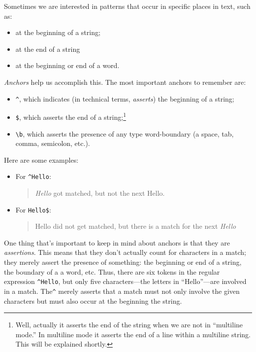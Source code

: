 \documentclass[]{book}
\providecommand{\tightlist}{%
  \setlength{\itemsep}{0pt}\setlength{\parskip}{0pt}}
\let\rmarkdownfootnote\footnote%
\def\footnote{\protect\rmarkdownfootnote}
\theoremstyle{definition}
\theoremstyle{definition}
\theoremstyle{remark}
\begin{document}
{Sometimes we are interested in patterns that occur in specific places in
text, such as:

\begin{itemize}
\tightlist
\item
  at the beginning of a string;
\item
  at the end of a string
\item
  at the beginning or end of a word.
\end{itemize}

\emph{Anchors} help us accomplish this. The most important
anchors to remember are:

\begin{itemize}
\tightlist
\item
  \texttt{\^{}}, which indicates (in technical terms, \emph{asserts})
  the beginning of a string;
\item
  \texttt{\$}, which asserts the end of a string;\footnote{Well,
    actually it asserts the end of the string when we are not in
    ``multiline mode.'' In multiline mode it asserts the end of a line
    within a multiline string. This will be explained shortly.}
\item
  \texttt{\textbackslash{}b}, which asserts the presence of any type
  word-boundary (a space, tab, comma, semicolon, etc.).
\end{itemize}

Here are some examples:

\begin{itemize}
\item
  For \texttt{\^{}Hello}:

  \begin{quote}
  \emph{Hello} got matched, but not the next Hello.
  \end{quote}
\item
  For \texttt{Hello\$}:

  \begin{quote}
  Hello did not get matched, but there is a match for the next
  \emph{Hello}
  \end{quote}
\end{itemize}

One thing that's important to keep in mind about anchors is that they
are \emph{assertions}. This means that they don't
actually count for characters in a match; they merely assert the
presence of something: the beginning or end of a string, the boundary of
a a word, etc. Thus, there are six tokens in the regular expression
\texttt{\^{}Hello}, but only five characters---the letters in
``Hello''---are involved in a match. The\texttt{\^{}} merely asserts
that a match must not only involve the given characters but must also
occur at the beginning the string.

}
\end{document}
